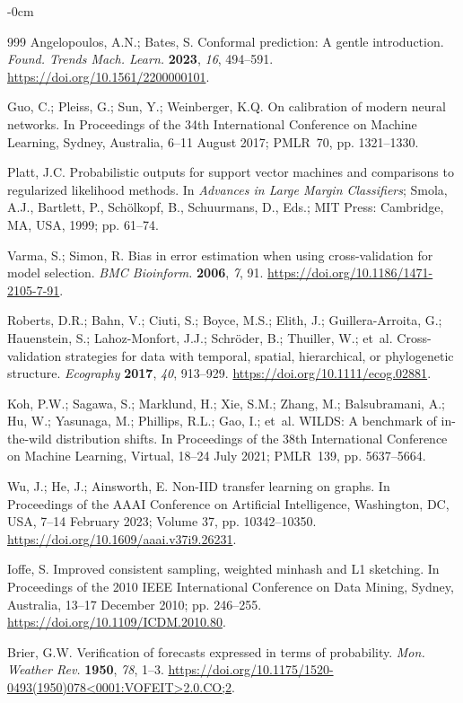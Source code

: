 \documentclass[applsci,article,submit,oneauthor]{Definitions/mdpi}
\begin{document}
\begin{adjustwidth}{-\extralength}{0cm}
\begin{thebibliography}{999}
 Angelopoulos, A.N.; Bates, S. Conformal prediction: A gentle introduction. \emph{Found. Trends Mach. Learn.} \textbf{2023}, \emph{16}, 494--591. \url{https://doi.org/10.1561/2200000101}.

 Guo, C.; Pleiss, G.; Sun, Y.; Weinberger, K.Q. On calibration of modern neural networks. In Proceedings of the 34th International Conference on Machine Learning, Sydney, Australia, 6--11 August 2017; PMLR~70, pp. 1321--1330.

 Platt, J.C. Probabilistic outputs for support vector machines and comparisons to regularized likelihood methods. In \emph{Advances in Large Margin Classifiers}; Smola, A.J., Bartlett, P., Sch\"{o}lkopf, B., Schuurmans, D., Eds.; MIT Press: Cambridge, MA, USA, 1999; pp. 61--74.

 Varma, S.; Simon, R. Bias in error estimation when using cross-validation for model selection. \emph{BMC Bioinform.} \textbf{2006}, \emph{7}, 91. \url{https://doi.org/10.1186/1471-2105-7-91}.

 Roberts, D.R.; Bahn, V.; Ciuti, S.; Boyce, M.S.; Elith, J.; Guillera-Arroita, G.; Hauenstein, S.; Lahoz-Monfort, J.J.; Schr\"{o}der, B.; Thuiller, W.; et~al. Cross-validation strategies for data with temporal, spatial, hierarchical, or phylogenetic structure. \emph{Ecography} \textbf{2017}, \emph{40}, 913--929. \url{https://doi.org/10.1111/ecog.02881}.

 Koh, P.W.; Sagawa, S.; Marklund, H.; Xie, S.M.; Zhang, M.; Balsubramani, A.; Hu, W.; Yasunaga, M.; Phillips, R.L.; Gao, I.; et~al. WILDS: A benchmark of in-the-wild distribution shifts. In Proceedings of the 38th International Conference on Machine Learning, Virtual, 18--24 July 2021; PMLR~139, pp. 5637--5664.

 Wu, J.; He, J.; Ainsworth, E. Non-IID transfer learning on graphs. In Proceedings of the AAAI Conference on Artificial Intelligence, Washington, DC, USA, 7--14 February 2023; Volume 37, pp. 10342--10350. \url{https://doi.org/10.1609/aaai.v37i9.26231}.

 Ioffe, S. Improved consistent sampling, weighted minhash and L1 sketching. In Proceedings of the 2010 IEEE International Conference on Data Mining, Sydney, Australia, 13--17 December 2010; pp. 246--255. \url{https://doi.org/10.1109/ICDM.2010.80}.

 Brier, G.W. Verification of forecasts expressed in terms of probability. \emph{Mon. Weather Rev.} \textbf{1950}, \emph{78}, 1--3. \url{https://doi.org/10.1175/1520-0493(1950)078<0001:VOFEIT>2.0.CO;2}.


\end{thebibliography}
\end{adjustwidth}
\end{document}
